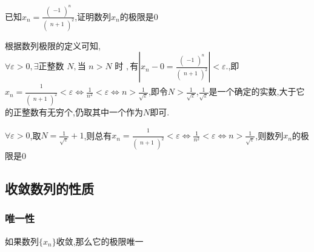 \documentclass[12pt, a4paper, oneside, UTF8]{ctexbook}  %
\begin{document}
\begin{problem}
已知$x_{n}=\frac{\left(\begin{array}{c}-1\\\end{array}\right)^{n}}{\left(\begin{array}{c}n+1\\\end{array}\right)^{2}}$,证明数列${x_n}$的极限是$0$
\end{problem}
\begin{note}
    根据数列极限的定义可知,$\forall\varepsilon>0,\exists\text{正整数 }N,\text{当 }n{>}N\text{ 时 },\text{有}|x_{n} - 0 =\frac{\left(\begin{array}{c}-1\\\end{array}\right)^{n}}{\left(\begin{array}{c}n+1\\\end{array}\right)^{2}}|<\varepsilon.$,即$x_{n}=\frac{\begin{array}{c}1\\\end{array}}{\left(\begin{array}{c}n+1\\\end{array}\right)^{2}} < \varepsilon \Leftrightarrow \frac{1}{n^2}< \varepsilon \Leftrightarrow n > \frac{1}{\sqrt{\varepsilon}}$,即令$N > \frac{1}{\sqrt{\varepsilon}}$,$\frac{1}{\sqrt{\varepsilon}}$是一个确定的实数,大于它的正整数有无穷个,仍取其中一个作为$N$即可.
\end{note}
\begin{solution}
    $\forall \varepsilon>0$,取$N=\frac{1}{\sqrt{\varepsilon}}+1$,则总有$x_{n}=\frac{\begin{array}{c}1\\\end{array}}{\left(\begin{array}{c}n+1\\\end{array}\right)^{2}} < \varepsilon \Leftrightarrow \frac{1}{n^2}< \varepsilon \Leftrightarrow n > \frac{1}{\sqrt{\varepsilon}}$,则数列${x_n}$的极限是$0$
\end{solution}
\subsection{收敛数列的性质}
\subsubsection{唯一性}
\begin{them}{}{}
    如果数列$\{ x_n \}$收敛,那么它的极限唯一
\end{them}
\end{document}
